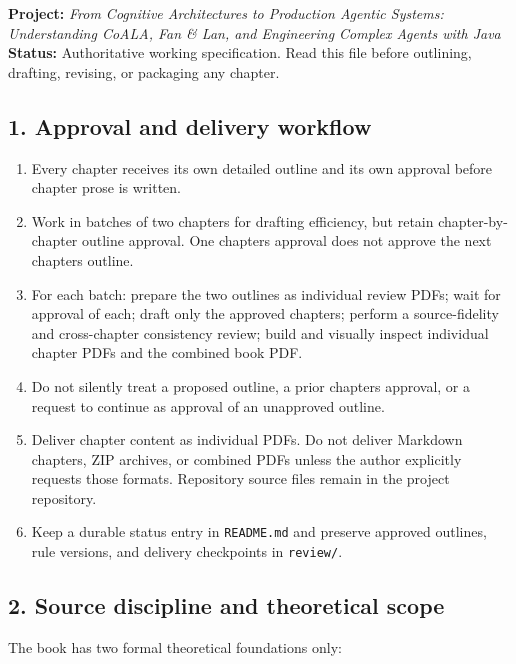 \textbf{Project:} \emph{From Cognitive Architectures to Production
Agentic Systems: Understanding CoALA, Fan \& Lan, and Engineering
Complex Agents with Java}\\
\textbf{Status:} Authoritative working specification. Read this file
before outlining, drafting, revising, or packaging any chapter.

\subsection{1. Approval and delivery
workflow}\label{1-approval-and-delivery-workflow}

\begin{enumerate}
\def\labelenumi{\arabic{enumi}.}
\tightlist
\item
  Every chapter receives its own detailed outline and its own approval
  before chapter prose is written.
\item
  Work in batches of two chapters for drafting efficiency, but retain
  chapter-by-chapter outline approval. One chapter\textquotesingle s
  approval does not approve the next chapter\textquotesingle s outline.
\item
  For each batch: prepare the two outlines as individual review PDFs;
  wait for approval of each; draft only the approved chapters; perform a
  source-fidelity and cross-chapter consistency review; build and
  visually inspect individual chapter PDFs and the combined book PDF.
\item
  Do not silently treat a proposed outline, a prior
  chapter\textquotesingle s approval, or a request to continue as
  approval of an unapproved outline.
\item
  Deliver chapter content as individual PDFs. Do not deliver Markdown
  chapters, ZIP archives, or combined PDFs unless the author explicitly
  requests those formats. Repository source files remain in the project
  repository.
\item
  Keep a durable status entry in \texttt{README.md} and preserve
  approved outlines, rule versions, and delivery checkpoints in
  \texttt{review/}.
\end{enumerate}

\subsection{2. Source discipline and theoretical
scope}\label{2-source-discipline-and-theoretical-scope}

The book has two formal theoretical foundations only:

